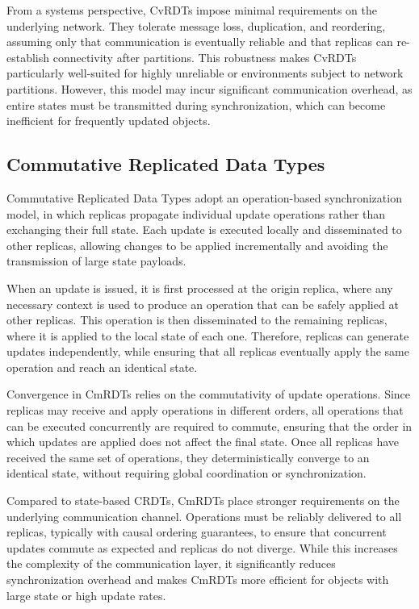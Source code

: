 From a systems perspective, CvRDTs impose minimal requirements on the underlying network. They tolerate message loss, duplication, and reordering, assuming only that communication is eventually reliable and that replicas can re-establish connectivity after partitions. This robustness makes CvRDTs particularly well-suited for highly unreliable or environments subject to network partitions. However, this model may incur significant communication overhead, as entire states must be transmitted during synchronization, which can become inefficient for frequently updated objects.

\subsection{Commutative Replicated Data Types}
\label{sub:cmrdts}

Commutative Replicated Data Types adopt an operation-based synchronization model, in which replicas propagate individual update operations rather than exchanging their full state. Each update is executed locally and disseminated to other replicas, allowing changes to be applied incrementally and avoiding the transmission of large state payloads.

When an update is issued, it is first processed at the origin replica, where any necessary context is used to produce an operation that can be safely applied at other replicas. This operation is then disseminated to the remaining replicas, where it is applied to the local state of each one. Therefore, replicas can generate updates independently, while ensuring that all replicas eventually apply the same operation and reach an identical state.

Convergence in CmRDTs relies on the commutativity of update operations. Since replicas may receive and apply operations in different orders, all operations that can be executed concurrently are required to commute, ensuring that the order in which updates are applied does not affect the final state. Once all replicas have received the same set of operations, they deterministically converge to an identical state, without requiring global coordination or synchronization.

Compared to state-based CRDTs, CmRDTs place stronger requirements on the underlying communication channel. Operations must be reliably delivered to all replicas, typically with causal ordering guarantees, to ensure that concurrent updates commute as expected and replicas do not diverge. While this increases the complexity of the communication layer, it significantly reduces synchronization overhead and makes CmRDTs more efficient for objects with large state or high update rates.

